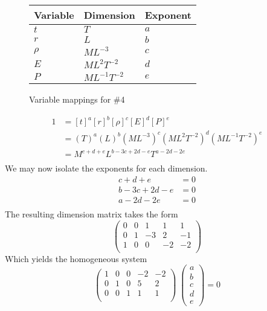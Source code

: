\documentclass[12pt]{article}
\begin{document}
  \begin{figure}
    \centering
    \begin{tabularx}{0.5\textwidth}{XXX}
      Variable & Dimension & Exponent \\ \midrule
      $t$ & $T$ & $a$ \\
      $r$ & $L$ & $b$ \\
      $\rho$ & $ML^{-3}$ & $c$ \\
      $E$ & $ML^{2}T^{-2}$ & $d$ \\
      $P$ & $ML^{-1}T^{-2}$ & $e$ \\
    \end{tabularx}
    \caption{Variable mappings for \#4}
\label{fig:4-var-mappings}
  \end{figure}
  \begin{equation*}
    \begin{aligned}
      1 &= {[t]}^a {[r]}^b {[\rho]}^c {[E]}^d {[P]}^e \\
      &= {(T)}^a{(L)}^b{(ML^{-3})}^c{(ML^2T^{-2})}^d{(ML^{-1}T^{-2})}^e \\
      &= M^{c+d+e}L^{b-3c+2d-e}T^{a-2d-2e} \\
    \end{aligned}
  \end{equation*}
  We may now isolate the exponents for each dimension.
  \begin{equation*}
    \begin{aligned}
      c + d + e &= 0 \\
      b - 3c + 2d - e &= 0 \\
      a - 2d - 2e &= 0 \\
    \end{aligned}
  \end{equation*}
  The resulting dimension matrix takes the form
  \begin{equation*}
    \begin{pmatrix}
      0 & 0 & 1 & 1 & 1 \\
      0 & 1 & -3 & 2 & -1 \\
      1 & 0 & 0 & -2 & -2 \\
    \end{pmatrix}
  \end{equation*}
  Which yields the homogeneous system
  \begin{equation*}
    \begin{pmatrix}
      1 & 0 & 0 & -2 & -2 \\
      0 & 1 & 0 & 5 & 2 \\
      0 & 0 & 1 & 1 & 1 \\
    \end{pmatrix} \;
    \begin{pmatrix}
      a \\ b \\ c \\ d \\ e
    \end{pmatrix}
    = 0
  \end{equation*}
\end{document}
